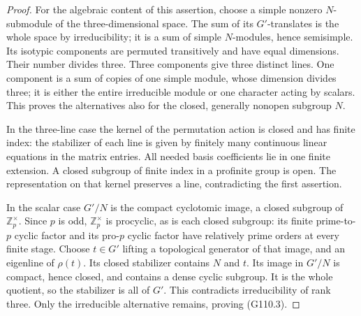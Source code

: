 \begin{proof}
For the algebraic content of this assertion, choose a simple
nonzero \(N\)-submodule of the three-dimensional space.
The sum of its \(G'\)-translates is the whole space by
irreducibility; it is a sum of simple \(N\)-modules, hence
semisimple. Its isotypic components are permuted transitively
and have equal dimensions. Their number divides three.
Three components give three distinct lines. One component
is a sum of copies of one simple module, whose dimension
divides three; it is either the entire irreducible module or
one character acting by scalars. This proves the alternatives
also for the closed, generally nonopen subgroup \(N\).

In the three-line case the kernel of the permutation action
is closed and has finite index: the stabilizer of each line
is given by finitely many continuous linear equations in the
matrix entries. All needed basis coefficients lie in one
finite extension. A closed subgroup of finite index in a
profinite group is open. The representation on that kernel
preserves a line, contradicting the first assertion.

In the scalar case \(G'/N\) is the compact cyclotomic image,
a closed subgroup of \(\mathbb Z_p^\times\). Since \(p\)
is odd, \(\mathbb Z_p^\times\) is procyclic, as is each
closed subgroup: its finite prime-to-\(p\) cyclic factor
and its pro-\(p\) cyclic factor have relatively prime
orders at every finite stage. Choose \(t\in G'\) lifting
a topological generator of that image, and an eigenline
of \(\rho(t)\). Its closed stabilizer contains \(N\)
and \(t\). Its image in \(G'/N\) is compact, hence
closed, and contains a dense cyclic subgroup. It is the
whole quotient, so the stabilizer is all of \(G'\).
This contradicts irreducibility of rank three. Only the
irreducible alternative remains, proving (G110.3).
\end{proof}

